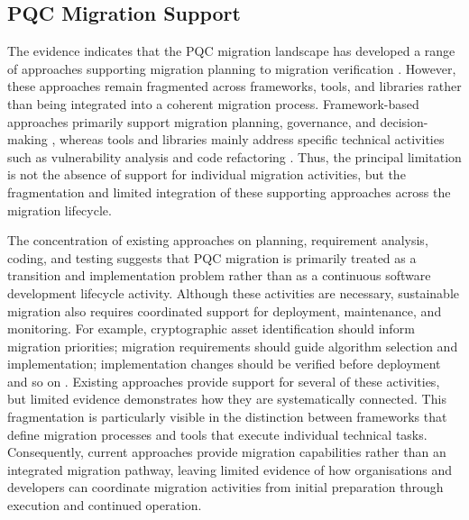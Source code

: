 \documentclass[letterpaper,twocolumn,10pt]{article}
\begin{document}
\subsection{PQC Migration Support}
\label{DisMigReady}

The evidence indicates that the PQC migration landscape has developed a range of approaches supporting migration planning to migration verification \cite{Ana_MigFrDepen, Ana_MigFrameOrg, Ana_PMMP, Ana_FinanceMig, Ana_decisionAlgo, Ana_rattanavipanon_toolchain_2025, Ana_android_Migr, Ana_ccPASTpqc, Ana_legacyToQuantumConvert}. However, these approaches remain fragmented across frameworks, tools, and libraries rather than being integrated into a coherent migration process. Framework-based approaches primarily support migration planning, governance, and decision-making \cite{Ana_MigFrDepen, Ana_MigFrameOrg, Ana_PMMP, Ana_FinanceMig, Ana_decisionAlgo}, whereas tools and libraries mainly address specific technical activities such as vulnerability analysis and code refactoring \cite{Ana_rattanavipanon_toolchain_2025, Ana_android_Migr, Ana_ccPASTpqc, Ana_legacyToQuantumConvert}. Thus, the principal limitation is not the absence of support for individual migration activities, but the fragmentation and limited integration of these supporting approaches across the migration lifecycle.

The concentration of existing approaches on planning, requirement analysis, coding, and testing suggests that PQC migration is primarily treated as a transition and implementation problem rather than as a continuous software development lifecycle activity. Although these activities are necessary, sustainable migration also requires coordinated support for deployment, maintenance, and monitoring. For example, cryptographic asset identification should inform migration priorities; migration requirements should guide algorithm selection and implementation; implementation changes should be verified before deployment and so on \cite{naether_migrating_2024, migration_Comparison}. Existing approaches provide support for several of these activities, but limited evidence demonstrates how they are systematically connected. This fragmentation is particularly visible in the distinction between frameworks that define migration processes and tools that execute individual technical tasks. Consequently, current approaches provide migration capabilities rather than an integrated migration pathway, leaving limited evidence of how organisations and developers can coordinate migration activities from initial preparation through execution and continued operation.
\end{document}
